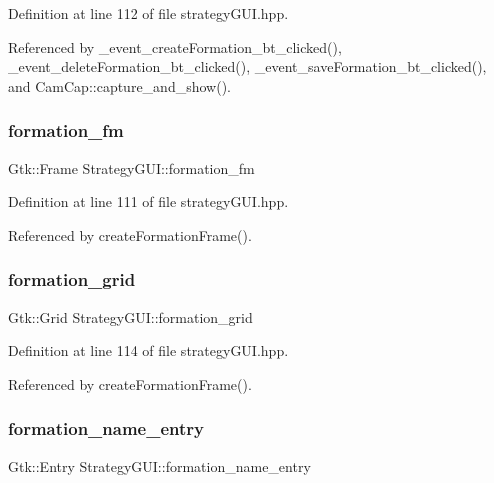 Definition at line 112 of file strategy\+G\+U\+I.\+hpp.



Referenced by \+\_\+event\+\_\+create\+Formation\+\_\+bt\+\_\+clicked(), \+\_\+event\+\_\+delete\+Formation\+\_\+bt\+\_\+clicked(), \+\_\+event\+\_\+save\+Formation\+\_\+bt\+\_\+clicked(), and Cam\+Cap\+::capture\+\_\+and\+\_\+show().

\mbox{\label{class_strategy_g_u_i_a1e0acda1bb4132bcb704eaf3bb0434f2}} 
\subsubsection{\texorpdfstring{formation\+\_\+fm}{formation\_fm}}
{\footnotesize\ttfamily Gtk\+::\+Frame Strategy\+G\+U\+I\+::formation\+\_\+fm}



Definition at line 111 of file strategy\+G\+U\+I.\+hpp.



Referenced by create\+Formation\+Frame().

\mbox{\label{class_strategy_g_u_i_a86e01136167ad809807e6341957a850c}} 
\subsubsection{\texorpdfstring{formation\+\_\+grid}{formation\_grid}}
{\footnotesize\ttfamily Gtk\+::\+Grid Strategy\+G\+U\+I\+::formation\+\_\+grid}



Definition at line 114 of file strategy\+G\+U\+I.\+hpp.



Referenced by create\+Formation\+Frame().

\mbox{\label{class_strategy_g_u_i_a19406b76eaf73c06545aa1c67c0636ce}} 
\subsubsection{\texorpdfstring{formation\+\_\+name\+\_\+entry}{formation\_name\_entry}}
{\footnotesize\ttfamily Gtk\+::\+Entry Strategy\+G\+U\+I\+::formation\+\_\+name\+\_\+entry}



